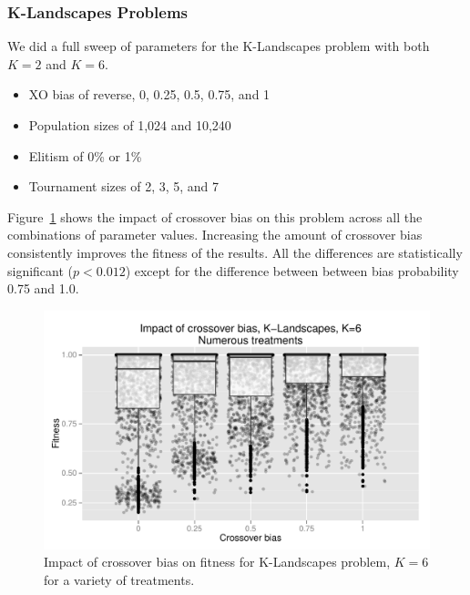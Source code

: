 \documentclass{sig-alternate}
\begin{document}
\subsubsection{K-Landscapes Problems}

We did a full sweep of parameters for the K-Landscapes problem with both $K=2$ and $K=6$.

\begin{itemize}
	\item XO bias of reverse, 0, 0.25, 0.5, 0.75, and 1
	\item Population sizes of 1,024 and 10,240
	\item Elitism of 0\% or 1\%
	\item Tournament sizes of 2, 3, 5, and 7
\end{itemize}

Figure~\ref{fig:KLandscapes6_results} shows the impact of crossover bias on this problem across all the 
combinations of parameter values. Increasing the amount of crossover bias consistently improves the 
fitness of the results. All the differences are statistically significant ($p < 0.012$) except for the difference between
between bias probability 0.75 and 1.0.

%
%
%
%

\begin{figure}
\centering
\includegraphics[width=0.45 \textwidth]{Plots/KLandscapes6_XO_bias_impact_transformed_boxplot_alpha075.pdf}
\caption{Impact of crossover bias on fitness for K-Landscapes problem, $K=6$ for a variety of treatments.}
\label{fig:KLandscapes6_results}
\end{figure}
\end{document}
